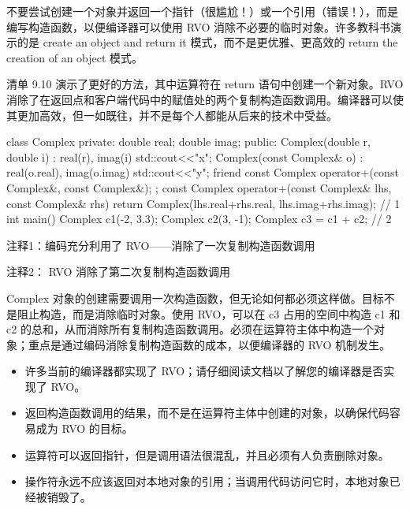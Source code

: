 
不要尝试创建一个对象并返回一个指针（很尴尬！）或一个引用（错误！），而是编写构造函数，以便编译器可以使用 RVO 消除不必要的临时对象。许多教科书演示的是 create an object and return it 模式，而不是更优雅、更高效的 return the creation of an object 模式。

清单 9.10 演示了更好的方法，其中运算符在 return 语句中创建一个新对象。RVO 消除了在返回点和客户端代码中的赋值处的两个复制构造函数调用。编译器可以使其更加高效，但一如既往，并不是每个人都能从后来的技术中受益。


\begin{cpp}
class Complex {
private:
  double real;
  double imag;
public:
  Complex(double r, double i) : real(r), imag(i) {std::cout<<"x\n";}
  Complex(const Complex& o) : real(o.real), imag(o.imag)
    { std::cout<<"y\n"; }
  friend const Complex operator+(const Complex&, const Complex&);
};
const Complex operator+(const Complex& lhs, const Complex& rhs) {
  return Complex(lhs.real+rhs.real, lhs.imag+rhs.imag); // 1
}
int main() {
  Complex c1(-2, 3.3);
  Complex c2(3, -1);
  Complex c3 = c1 + c2; // 2
}
\end{cpp}

{\footnotesize
注释1：编码充分利用了 RVO——消除了一次复制构造函数调用

注释2： RVO 消除了第二次复制构造函数调用
}

Complex 对象的创建需要调用一次构造函数，但无论如何都必须这样做。目标不是阻止构造，而是消除临时对象。使用 RVO，可以在 c3 占用的空间中构造 c1 和 c2 的总和，从而消除所有复制构造函数调用。必须在运算符主体中构造一个对象；重点是通过编码消除复制构造函数的成本，以便编译器的 RVO 机制发生。


\begin{itemize}
\item
许多当前的编译器都实现了 RVO；请仔细阅读文档以了解您的编译器是否实现了 RVO。

\item
返回构造函数调用的结果，而不是在运算符主体中创建的对象，以确保代码容易成为 RVO 的目标。

\item
运算符可以返回指针，但是调用语法很混乱，并且必须有人负责删除对象。

\item
操作符永远不应该返回对本地对象的引用；当调用代码访问它时，本地对象已经被销毁了。
\end{itemize}










